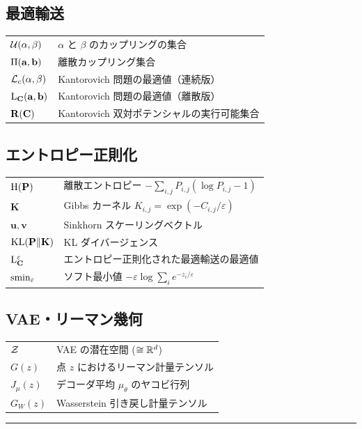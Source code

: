 \documentclass[uplatex, dvipdfmx]{jsreport}
\begin{document}
\subsection*{最適輸送}
\begin{tabular}{ll}
  $\mathcal{U}(\alpha, \beta)$ & $\alpha$ と $\beta$ のカップリングの集合 \\
  $\Pi(\mathbf{a}, \mathbf{b})$ & 離散カップリング集合 \\
  $\mathcal{L}_c(\alpha, \beta)$ & Kantorovich 問題の最適値（連続版） \\
  $\mathrm{L}_{\mathbf{C}}(\mathbf{a}, \mathbf{b})$ & Kantorovich 問題の最適値（離散版） \\
  $\mathbf{R}(\mathbf{C})$ & Kantorovich 双対ポテンシャルの実行可能集合 \\
\end{tabular}

\subsection*{エントロピー正則化}
\begin{tabular}{ll}
  $\mathrm{H}(\mathbf{P})$ & 離散エントロピー $-\sum_{i,j} P_{i,j}(\log P_{i,j} - 1)$ \\
  $\mathbf{K}$ & Gibbs カーネル $K_{i,j} = \exp(-C_{i,j}/\varepsilon)$ \\
  $\mathbf{u},\mathbf{v}$ & Sinkhorn スケーリングベクトル \\
  $\mathrm{KL}(\mathbf{P} \| \mathbf{K})$ & KL ダイバージェンス \\
  $\mathrm{L}_{\mathbf{C}}^\varepsilon$ & エントロピー正則化された最適輸送の最適値 \\
  $\operatorname{smin}_\varepsilon$ & ソフト最小値 $-\varepsilon \log \sum_i e^{-z_i/\varepsilon}$ \\
\end{tabular}

\subsection*{VAE・リーマン幾何}
\begin{tabular}{ll}
  $\mathcal{Z}$ & VAE の潜在空間 ($\cong \mathbb{R}^d$) \\
  $G(z)$ & 点 $z$ におけるリーマン計量テンソル \\
  $J_\mu(z)$ & デコーダ平均 $\mu_\theta$ のヤコビ行列 \\
  $G_W(z)$ & Wasserstein 引き戻し計量テンソル \\
\end{tabular}

\vspace{1em}
\hrule






\end{document}
